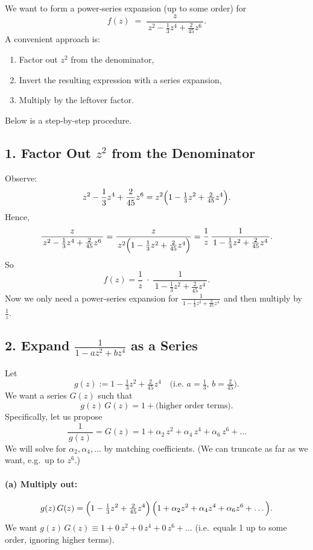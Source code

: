 \documentclass[12pt]{article}
\theoremstyle{definition} %
\theoremstyle{plain} %
\begin{document}
We want to form a power‐series expansion (up to some order) for
\[
f(z)
\;=\;
\frac{z}{\,z^2 - \tfrac{1}{3}z^4 + \tfrac{2}{45}z^6\,}.
\]
A convenient approach is:
\begin{enumerate}
  \item Factor out \(z^2\) from the denominator,
  \item Invert the resulting expression with a series expansion,
  \item Multiply by the leftover factor.
\end{enumerate}

Below is a step‐by‐step procedure.

\bigskip

\subsection*{1. Factor Out \(z^2\) from the Denominator}

Observe:
\[
z^2 - \frac{1}{3}z^4 + \frac{2}{45}z^6
= z^2\Bigl(1 - \tfrac{1}{3}z^2 + \tfrac{2}{45}z^4\Bigr).
\]
Hence,
\[
\frac{z}{\,z^2 - \tfrac{1}{3}z^4 + \tfrac{2}{45}z^6\,}
= \frac{z}{\,z^2\Bigl(1 - \tfrac{1}{3}z^2 + \tfrac{2}{45}z^4\Bigr)}
= \frac{1}{z}\,\frac{1}{\,1 - \tfrac{1}{3}z^2 + \tfrac{2}{45}z^4\,}.
\]
So
\[
f(z) 
= \frac{1}{z} \; \cdot \; \frac{1}{\,1 - \tfrac{1}{3}z^2 + \tfrac{2}{45}z^4\,}.
\]
Now we only need a power‐series expansion for 
\(\displaystyle \frac{1}{\,1 - \tfrac{1}{3}z^2 + \tfrac{2}{45}z^4\,}\)
and then multiply by \(\tfrac{1}{z}\).

\bigskip

\subsection*{2. Expand \(\displaystyle \frac{1}{1 - a z^2 + b z^4}\) as a Series}

Let 
\[
g(z) := 1 - \tfrac{1}{3}z^2 + \tfrac{2}{45}z^4
\quad\text{(i.e.\ }a=\tfrac{1}{3},\, b=\tfrac{2}{45}\text{)}.
\]
We want a series $G(z)$ such that
\[
g(z)\,G(z) = 1 + \text{(higher order terms)}.
\]
Specifically, let us propose
\[
\frac{1}{\,g(z)\,}
= G(z)
= 1 + \alpha_2\,z^2 + \alpha_4\,z^4 + \alpha_6\,z^6 + \dots
\]
We will solve for $\alpha_2, \alpha_4, \dots$ by matching coefficients.  (We can truncate as far as we want, e.g.\ up to $z^6$.)

\medskip

\paragraph{(a) Multiply out:}
\[
g(z)\,G(z)
= \Bigl(1 - \tfrac{1}{3}z^2 + \tfrac{2}{45}z^4\Bigr)\,\Bigl(1 + \alpha_2 z^2 + \alpha_4 z^4 + \alpha_6 z^6 + \dots\Bigr).
\]
We want $g(z)\,G(z) \equiv 1 + 0\,z^2 + 0\,z^4 + 0\,z^6 + \dots$ (i.e.\ equals 1 up to some order, ignoring higher terms).
\end{document}

